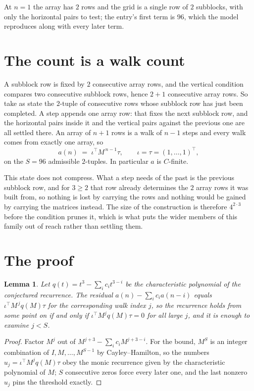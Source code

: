 \documentclass[11pt,a4paper]{article}
\theoremstyle{plain}
\newtheorem{lemma}[theorem]{Lemma}
\theoremstyle{definition}
\begin{document}
At $n=1$ the array has $2$ rows and the grid is a single row of $2$
subblocks, with only the horizontal pairs to test; the entry's first term is
$96$, which the model reproduces along with every later term.

\section{The count is a walk count}

A subblock row is fixed by $2$ consecutive array rows, and the vertical condition compares
two consecutive subblock rows, hence $2+1$ consecutive array rows. So take as state the
$2$-tuple of consecutive rows whose subblock row has just been completed. A step appends one
array row: that fixes the next subblock row, and the horizontal pairs inside it and the
vertical pairs against the previous one are all settled there. An array of $n+1$ rows is
a walk of $n-1$ steps and every walk comes from exactly one array, so
\[
a(n)\;=\;\iota^{\!\top}M^{\,n-1}\tau,\qquad\iota=\tau=(1,\dots,1)^{\!\top},
\]
on the $S=96$ admissible $2$-tuples. In particular $a$ is $C$-finite.

This state does not compress. What a step needs of the past is the previous subblock row, and
for $3\ge2$ that row already determines the $2$ array rows it was built from, so nothing
is lost by carrying the rows and nothing would be gained by carrying the matrices instead. The
size of the construction is therefore $4^{2\cdot3}$ before the condition prunes
it, which is what puts the wider members of this family out of reach rather than settling them.

\section{The proof}

\begin{lemma}\label{lem:crit}
Let $q(t)=t^{3}-\sum_i c_it^{3-i}$ be the characteristic polynomial of the
conjectured recurrence. The residual $a(n)-\sum_ic_ia(n-i)$ equals
$\iota^{\!\top}M^{\,j}q(M)\tau$ for the corresponding walk index $j$, so the recurrence
holds from some point on if and only if $\iota^{\!\top}M^{j}q(M)\tau=0$ for all large $j$,
and it is enough to examine $j<S$.
\end{lemma}

\begin{proof}
Factor $M^{j}$ out of $M^{j+3}-\sum_ic_iM^{j+3-i}$. For the bound, $M^{S}$
is an integer combination of $I,M,\dots,M^{S-1}$ by Cayley--Hamilton, so the numbers
$u_j=\iota^{\!\top}M^{j}q(M)\tau$ obey the monic recurrence given by the characteristic
polynomial of $M$; $S$ consecutive zeros force every later one, and the last nonzero $u_j$
pins the threshold exactly.
\end{proof}
\end{document}
